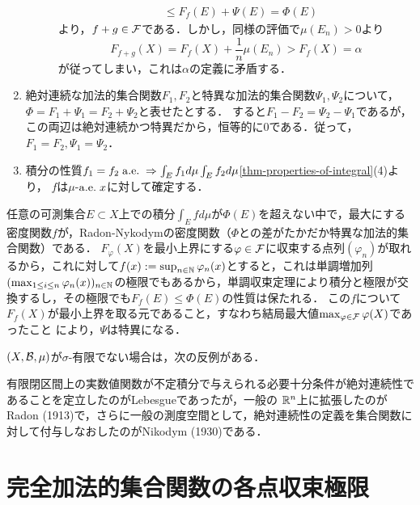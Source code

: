 \documentclass[uplatex, dvipdfmx]{jsreport}
\begin{document}
\begin{Proof}
\begin{enumerate}
\begin{description}
\begin{align*}
                &\le F_f(E)+\Psi(E)=\Phi(E)
            \end{align*}
            より，$f+g\in\mathcal{F}$である．しかし，同様の評価で$\mu(E_n)>0$より
            \[F_{f+g}(X)=F_f(X)+\frac{1}{n}\mu(E_n)>F_f(X)=\alpha\]
            が従ってしまい，これは$\alpha$の定義に矛盾する．
        \end{description}
        \item 絶対連続な加法的集合関数$F_1,F_2$と特異な加法的集合関数$\Psi_1,\Psi_2$について，$\Phi=F_1+\Psi_1=F_2+\Psi_2$と表せたとする．
        すると$F_1-F_2=\Psi_2-\Psi_1$であるが，この両辺は絶対連続かつ特異だから，恒等的に$0$である．従って，$F_1=F_2,\Psi_1=\Psi_2$．
        \item 積分の性質$f_1=f_2\;\mathrm{a.e.}\;\Rightarrow\int_Ef_1d\mu\int_Ef_2d\mu$\ref{thm-properties-of-integral}(4)より，
        $f$は$\mu$-$\mathrm{a.e.}\; x$に対して確定する．
    \end{enumerate}
\end{Proof}
\begin{remarks}[列を巧みに用いた構成]
    \item 任意の可測集合$E\subset X$上での積分$\int_Efd\mu$が$\Phi(E)$を超えない中で，最大にする密度関数$f$が，Radon-Nykodymの密度関数（$\Phi$との差がたかだか特異な加法的集合関数）である．
    $F_\varphi(X)$を最小上界にする$\varphi\in\mathcal{F}$に収束する点列$(\varphi_n)$が取れるから，これに対して$f(x):=\sup_{n\in\mathbb{N}}\varphi_n(x)$とすると，これは単調増加列$(\max_{1\le i\le n}\varphi_n(x))_{n\in\mathbb{N}}$の極限でもあるから，単調収束定理により積分と極限が交換するし，その極限でも$F_f(E)\le\Phi(E)$の性質は保たれる．
    この$f$について$F_f(X)$が最小上界を取る元であること，すなわち結局最大値$\max_{\varphi\in\mathcal{F}}\varphi(X)$であったこと
    により，$\Psi$は特異になる．
\end{remarks}
\begin{counterexample}
    $(X,\mathcal{B},\mu)$が$\sigma$-有限でない場合は，次の反例がある．
\end{counterexample}

\begin{history}
    有限閉区間上の実数値関数が不定積分で与えられる必要十分条件が絶対連続性であることを定立したのがLebesgueであったが，一般の
    $\mathbb{R}^n$上に拡張したのがRadon (1913)で，さらに一般の測度空間として，絶対連続性の定義を集合関数に対して付与しなおしたのがNikodym (1930)である．
\end{history}

\section{完全加法的集合関数の各点収束極限}
\end{document}
